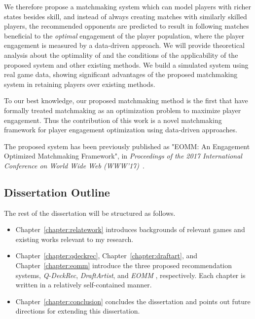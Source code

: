 We therefore propose a matchmaking system which can model players with richer states besides skill, and instead of always creating matches with similarly skilled players, the recommended opponents are predicted to result in following matches beneficial to the \textit{optimal} engagement of the  player population, where the player engagement is measured by a data-driven approach. We will provide theoretical analysis about the optimality of and the conditions of the applicability of the proposed system and other existing methods. We build a simulated system using real game data, showing significant advantages of the proposed matchmaking system in retaining players over existing methods. 

To our best knowledge, our proposed matchmaking method is the first that have formally treated matchmaking as an
optimization problem to maximize player engagement. Thus the contribution of this work is a novel matchmaking framework for player engagement optimization using data-driven approaches.

The proposed system has been previously published as "EOMM: An Engagement Optimized Matchmaking Framework", in \textit{Proceedings of the 2017 International Conference on World Wide Web (WWW'17)}~\cite{chen2017eomm}.




\subsection{Dissertation Outline}
The rest of the dissertation will be structured as follows. 
\begin{itemize}
\item Chapter~\ref{chapter:relatework} introduces backgrounds of relevant games and existing works relevant to my research. 
\item Chapter~\ref{chapter:qdeckrec}, Chapter~\ref{chapter:draftart}, and Chapter~\ref{chapter:eomm} introduce the three proposed recommendation systems, \textit{Q-DeckRec}, \textit{DraftArtist}, and \textit{EOMM} , respectively. Each chapter is written in a relatively self-contained manner.
\item Chapter~\ref{chapter:conclusion} concludes the dissertation and points out future directions for extending this dissertation.
\end{itemize}




